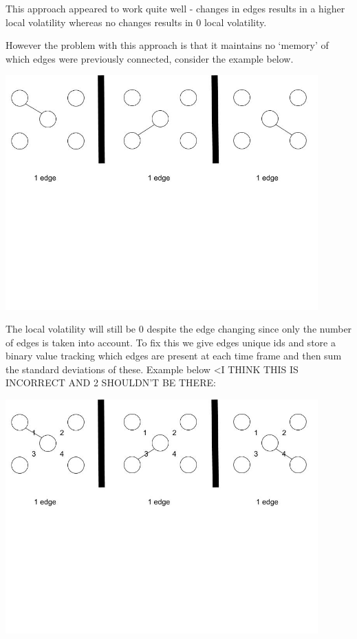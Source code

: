 This approach appeared to work quite well - changes in edges results in a higher local volatility whereas no changes results in 0 local volatility.

However the problem with this approach is that it maintains no ‘memory’ of which edges were previously connected, consider the example below.
\begin{center}
\includegraphics[trim={0 10cm 0 -1cm}, width=120mm]{./Figures/volatility3.jpg}
\end{center}

The local volatility will still be 0 despite the edge changing since only the number of edges is taken into account.
To fix this we give edges unique ids and store a binary value tracking which edges are present at each time frame and then sum the standard deviations of these. Example below <I THINK THIS IS INCORRECT AND 2 SHOULDN'T BE THERE:

\begin{center}
\includegraphics[trim={0 10cm 0 -1cm}, width=120mm]{./Figures/volatility4.jpg}
\end{center}

